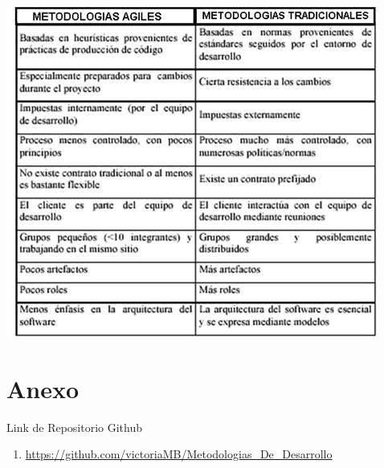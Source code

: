 \documentclass[a4paper,11pt]{article}
\begin{document}
    \includegraphics{comparativo}
\newpage
 
\section{Anexo }

Link de Repositorio Github
\begin{enumerate}
\item \url{https://github.com/victoriaMB/Metodologias_De_Desarrollo}
\end{enumerate}
\end{document}
